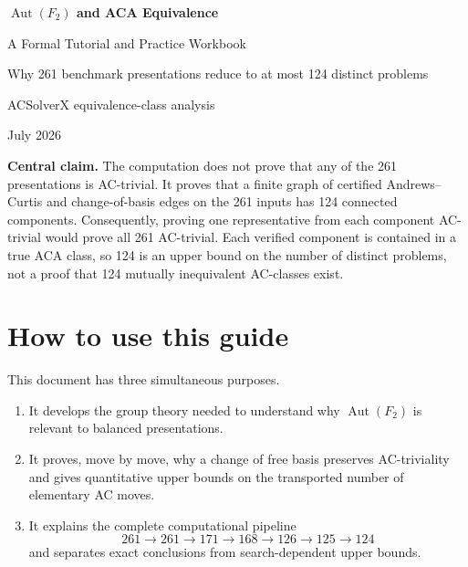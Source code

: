 \documentclass[11pt]{article}
\theoremstyle{definition}
\theoremstyle{remark}
\newcommand{\F}{F_2}
\newcommand{\Aut}{\operatorname{Aut}}
\begin{document}
\hypersetup{pageanchor=false}

\begin{titlepage}
\centering
\vspace*{1.3in}
{\Huge\bfseries \(\operatorname{Aut}(F_2)\) and ACA Equivalence\par}
\vspace{0.35in}
{\Large A Formal Tutorial and Practice Workbook\par}
\vspace{0.2in}
{\large Why 261 benchmark presentations reduce to at most 124 distinct problems\par}
\vfill
{\large ACSolverX equivalence-class analysis\par}
\vspace{0.15in}
{\large July 2026\par}
\vfill
\begin{minipage}{0.86\textwidth}
\small
\textbf{Central claim.}
The computation does not prove that any of the 261 presentations is
AC-trivial.  It proves that a finite graph of certified Andrews--Curtis and
change-of-basis edges on the 261 inputs has 124 connected components.
Consequently, proving one representative from each component AC-trivial
would prove all 261 AC-trivial.  Each verified component is contained in a
true ACA class, so 124 is an upper bound on the number of distinct problems,
not a proof that 124 mutually inequivalent AC-classes exist.
\end{minipage}
\end{titlepage}

\hypersetup{pageanchor=true}
\tableofcontents
\clearpage
{}

\section*{How to use this guide}

This document has three simultaneous purposes.

\begin{enumerate}
  \item It develops the group theory needed to understand why
  \(\Aut(\F)\) is relevant to balanced presentations.
  \item It proves, move by move, why a change of free basis preserves
  AC-triviality and gives quantitative upper bounds on the transported
  number of elementary AC moves.
  \item It explains the complete computational pipeline
  \[
    261\longrightarrow261\longrightarrow171\longrightarrow168
    \longrightarrow126\longrightarrow125\longrightarrow124
  \]
  and separates exact conclusions from search-dependent upper bounds.
\end{enumerate}
\end{document}
